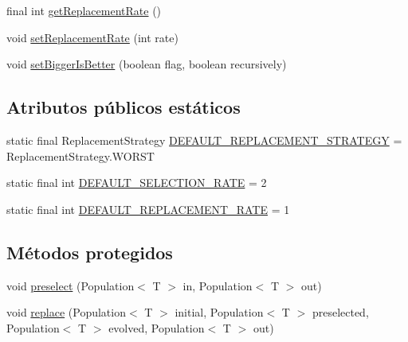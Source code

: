 \begin{DoxyCompactItemize}
\item 
final int \hyperlink{classjenes_1_1stage_1_1operator_1_1common_1_1_steady_state_3_01_t_01extends_01_chromosome_01_4_a32b13dd16c8bb611085477f02bc23cfc}{get\-Replacement\-Rate} ()
\item 
void \hyperlink{classjenes_1_1stage_1_1operator_1_1common_1_1_steady_state_3_01_t_01extends_01_chromosome_01_4_a8e504ea91d2e2c18fefa54042388e188}{set\-Replacement\-Rate} (int rate)
\item 
void \hyperlink{classjenes_1_1stage_1_1operator_1_1common_1_1_steady_state_3_01_t_01extends_01_chromosome_01_4_a4aaac6d7b52c8d107b98ab9170a14715}{set\-Bigger\-Is\-Better} (boolean flag, boolean recursively)
\end{DoxyCompactItemize}
\subsection*{Atributos públicos estáticos}
\begin{DoxyCompactItemize}
\item 
static final Replacement\-Strategy \hyperlink{classjenes_1_1stage_1_1operator_1_1common_1_1_steady_state_3_01_t_01extends_01_chromosome_01_4_a4ed786deaaaefebd47fffc18e99b3710}{D\-E\-F\-A\-U\-L\-T\-\_\-\-R\-E\-P\-L\-A\-C\-E\-M\-E\-N\-T\-\_\-\-S\-T\-R\-A\-T\-E\-G\-Y} = Replacement\-Strategy.\-W\-O\-R\-S\-T
\item 
static final int \hyperlink{classjenes_1_1stage_1_1operator_1_1common_1_1_steady_state_3_01_t_01extends_01_chromosome_01_4_a9d6bcfbcf1911ce2936e782e96919ebd}{D\-E\-F\-A\-U\-L\-T\-\_\-\-S\-E\-L\-E\-C\-T\-I\-O\-N\-\_\-\-R\-A\-T\-E} = 2
\item 
static final int \hyperlink{classjenes_1_1stage_1_1operator_1_1common_1_1_steady_state_3_01_t_01extends_01_chromosome_01_4_a9700692d577e24267d1105f2a6e3d379}{D\-E\-F\-A\-U\-L\-T\-\_\-\-R\-E\-P\-L\-A\-C\-E\-M\-E\-N\-T\-\_\-\-R\-A\-T\-E} = 1
\end{DoxyCompactItemize}
\subsection*{Métodos protegidos}
\begin{DoxyCompactItemize}
\item 
void \hyperlink{classjenes_1_1stage_1_1operator_1_1common_1_1_steady_state_3_01_t_01extends_01_chromosome_01_4_a4cc6031dfce1f23a49dfb6270be45358}{preselect} (Population$<$ T $>$ in, Population$<$ T $>$ out)
\item 
void \hyperlink{classjenes_1_1stage_1_1operator_1_1common_1_1_steady_state_3_01_t_01extends_01_chromosome_01_4_aedd46a5fd49b71554354612f991c1482}{replace} (Population$<$ T $>$ initial, Population$<$ T $>$ preselected, Population$<$ T $>$ evolved, Population$<$ T $>$ out)
\end{DoxyCompactItemize}
